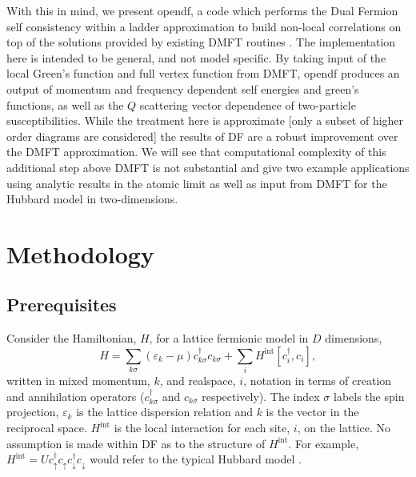 \documentclass[3p,times,procedia]{elsarticle}
\begin{document}
With this in mind, we present opendf, a code which performs the Dual Fermion self consistency within a ladder approximation to build non-local correlations on top of the solutions provided by existing DMFT routines \cite{Rubtsov2008,HafermannLi:2009}. The implementation here is intended to be general, and not model specific. By taking input of the local Green's function and full vertex function from DMFT, opendf produces an output of momentum and frequency dependent self energies and green's functions, as well as the $Q$ scattering vector dependence of two-particle susceptibilities.  While the treatment here is approximate [only a subset of higher order diagrams are considered] the results of DF are a robust improvement over the DMFT approximation.  We will see that computational complexity of this additional step above DMFT is not substantial and give two example applications using analytic results in the atomic limit as well as input from DMFT for the Hubbard model in two-dimensions.

\section{Methodology}
\subsection{Prerequisites}
Consider the Hamiltonian, $H$, for a lattice fermionic model in $D$ dimensions,
\begin{equation}
H = \sum_{k\sigma} (\varepsilon_k - \mu) c^\dagger_{k\sigma} c_{k\sigma} + \sum_i H^{\mathrm{int}} [c^\dagger_i, c_i],
\end{equation}
written in mixed momentum, $k$, and realspace, $i$, notation in terms of creation and annihilation operators ($c^\dagger_{k\sigma}$ and $c_{k\sigma}$ respectively).  The index $\sigma$ labels the spin projection, $\varepsilon_k$ is the lattice dispersion relation and $k$ is the vector in the reciprocal space. 
$H^{\mathrm{int}}$ is the local interaction for each site, $i$, on the lattice. 
No assumption is made within DF as to the structure of $H^{\mathrm{int}}$.  For example, $H^{\mathrm{int}} = U c^\dagger_\uparrow c_\uparrow c^\dagger_\downarrow c_\downarrow$ would refer to the typical Hubbard model \cite{Hubbard1963}. 
\end{document}
